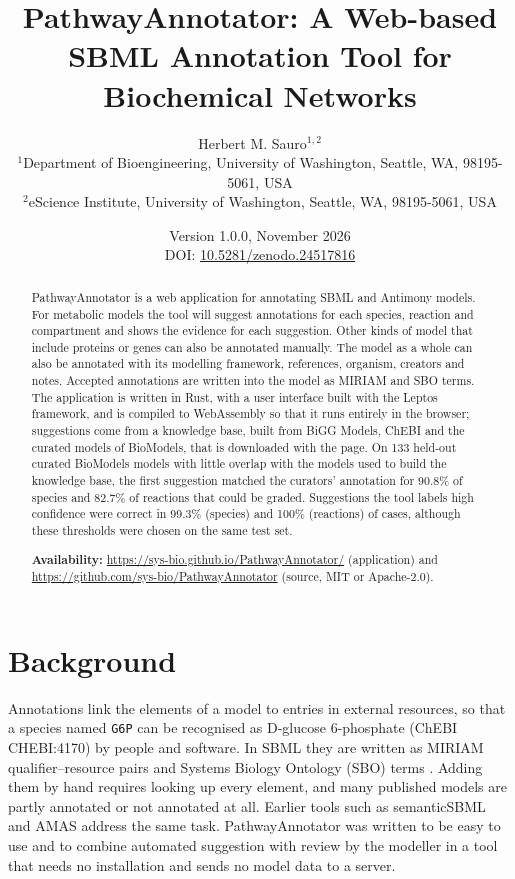 \documentclass[10pt]{article}
\title{\vspace{-1.5em}PathwayAnnotator: A Web-based SBML Annotation Tool for Biochemical Networks}
\author{Herbert M. Sauro$^{1,2}$\\[1ex]
  \small $^{1}$Department of Bioengineering, University of Washington, Seattle, WA, 98195-5061, USA\\
  \small $^{2}$eScience Institute, University of Washington, Seattle, WA, 98195-5061, USA
}
\date{\small Version 1.0.0, November 2026\\
  DOI: \href{https://doi.org/10.5281/zenodo.24517816}{10.5281/zenodo.24517816}}
\begin{document}
\maketitle
\vspace{-1em}

\begin{abstract}
\noindent
PathwayAnnotator is a web application for annotating SBML and Antimony models. For metabolic models the tool will
suggest annotations for each species, reaction and compartment and shows the evidence for each suggestion. Other kinds of
model that include proteins or genes can also be annotated manually. The model
as a whole can also be annotated with its modelling framework, references, organism, creators and notes.
Accepted annotations are written into the model as MIRIAM and SBO terms. The application is written in Rust,
with a user interface built with the Leptos framework, and is compiled to WebAssembly so that it runs entirely
in the browser; suggestions come from a
knowledge base, built from BiGG Models, ChEBI and the curated models of BioModels, that is downloaded with
the page. On 133 held-out curated BioModels models with little overlap with the models used to build the
knowledge base, the first suggestion matched the curators' annotation for 90.8\% of species and 82.7\% of
reactions that could be graded. Suggestions the tool labels high confidence were correct in 99.3\% (species)
and 100\% (reactions) of cases, although these thresholds were chosen on the same test set.

\noindent\textbf{Availability:} \url{https://sys-bio.github.io/PathwayAnnotator/} (application) and
\url{https://github.com/sys-bio/PathwayAnnotator} (source, MIT or Apache-2.0).
\end{abstract}

\section{Background}
Annotations link the elements of a model to entries in external resources, so that a species named
\texttt{G6P} can be recognised as D-glucose 6-phosphate (ChEBI CHEBI:4170) by people and software. In SBML
\cite{hucka2003sbml} they are written as MIRIAM qualifier--resource pairs \cite{lenovere2005miriam} and
Systems Biology Ontology (SBO) terms \cite{courtot2011sbo}. Adding them by hand requires looking up every
element, and many published models are partly annotated or not annotated at all. Earlier tools such as
semanticSBML \cite{krause2010semanticsbml} and AMAS \cite{shin2023amas} address the same task. PathwayAnnotator
was written to be easy to use and to combine automated suggestion with review by the modeller in a tool that needs no
installation and sends no model data to a server.
\end{document}
